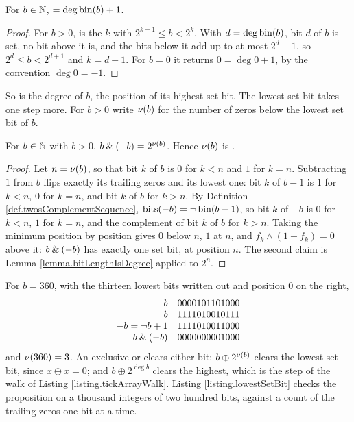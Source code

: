 \begin{lemma}\label{lemma.bitLengthIsDegree}
 For $b \in \mathbb{N}$,  $= \deg \mathrm{bin}(b) + 1$.
\end{lemma}
\begin{proof}
 For $b > 0$,  is the $k$ with $2^{k-1} \leq b < 2^{k}$.
 With $d = \deg \mathrm{bin}(b)$,
 bit $d$ of $b$ is set, no bit above it is, and the bits below it add up to at most $2^d - 1$,
 so $2^d \leq b < 2^{d+1}$ and $k = d + 1$.
 For $b = 0$ it returns $0 = \deg 0 + 1$, by the convention $\deg 0 = -1$.
\end{proof}

So  is the degree of $b$, the position of its highest set bit.
The lowest set bit takes one step more.
For $b > 0$ write $\nu(b)$ for the number of zeros below the lowest set bit of $b$.

\begin{prop}\label{prop.lowestSetBit}
 For $b \in \mathbb{N}$ with $b > 0$, $b \mathbin{\&} (-b) = 2^{\nu(b)}$.
 Hence $\nu(b)$ is .
\end{prop}
\begin{proof}
 Let $n = \nu(b)$, so that bit $k$ of $b$ is $0$ for $k < n$ and $1$ for $k = n$.
 Subtracting $1$ from $b$ flips exactly its trailing zeros and its lowest one:
 bit $k$ of $b - 1$ is $1$ for $k < n$, $0$ for $k = n$, and bit $k$ of $b$ for $k > n$.
 By Definition \ref{def.twosComplementSequence},
 $\mathrm{bits}(-b) = \neg\,\mathrm{bin}(b-1)$,
 so bit $k$ of $-b$ is $0$ for $k < n$, $1$ for $k = n$,
 and the complement of bit $k$ of $b$ for $k > n$.
 Taking the minimum position by position gives $0$ below $n$, $1$ at $n$,
 and $f_k \wedge (1 - f_k) = 0$ above it:
 $b \mathbin{\&} (-b)$ has exactly one set bit, at position $n$.
 The second claim is Lemma \ref{lemma.bitLengthIsDegree} applied to $2^{n}$.
\end{proof}

For $b = 360$, with the thirteen lowest bits written out and position $0$ on the right,
\begin{equation*}
 \begin{array}{rl}
  b & 0000101101000 \\
  \neg b & 1111010010111 \\
  -b = \neg b + 1 & 1111010011000 \\
  b \mathbin{\&} (-b) & 0000000001000
 \end{array}
\end{equation*}
and $\nu(360) = 3$.
An exclusive or clears either bit:
$b \oplus 2^{\nu(b)}$ clears the lowest set bit, since $x \oplus x = 0$;
and $b \oplus 2^{\deg b}$ clears the highest,
which is the step  of the walk of
Listing \ref{listing.tickArrayWalk}.
Listing \ref{listing.lowestSetBit} checks the proposition on a thousand integers
of two hundred bits, against a count of the trailing zeros one bit at a time.

